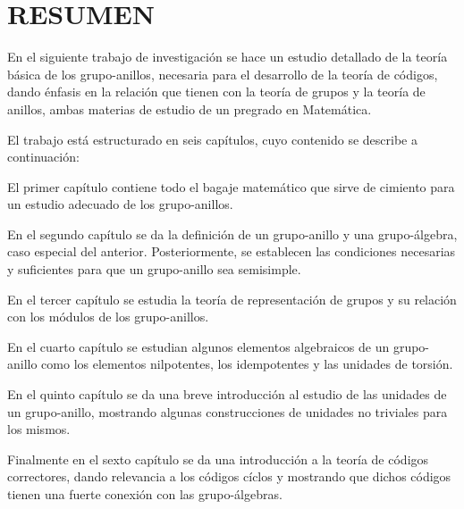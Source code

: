 \chapter{RESUMEN}
En el siguiente trabajo de investigación se hace un estudio detallado de la teoría básica de los grupo-anillos, necesaria para el desarrollo de la teoría de códigos\textbf{}, dando énfasis en la relación que tienen con la teoría de grupos y la teoría de anillos, ambas materias de estudio de un pregrado en Matemática.

El trabajo está estructurado en seis capítulos, cuyo contenido se describe a continuación:

El primer capítulo contiene todo el bagaje matemático que sirve de cimiento para un  estudio adecuado de los grupo-anillos. 

En el segundo capítulo se da la definición de un grupo-anillo y una grupo-álgebra, caso especial del anterior. Posteriormente, se establecen las condiciones necesarias y suficientes para que un grupo-anillo sea semisimple. 

En el tercer capítulo se estudia la teoría de representación de grupos y su relación con los módulos de los grupo-anillos. 

En el cuarto capítulo se estudian algunos elementos algebraicos de un grupo-anillo como los elementos nilpotentes, los idempotentes y las unidades de torsión.

En el quinto capítulo se da una breve introducción al estudio de las unidades de un grupo-anillo, mostrando algunas construcciones de unidades no triviales para los mismos.

Finalmente en el sexto capítulo se da una introducción a la teoría de códigos correctores, dando relevancia a los códigos cíclos y mostrando que dichos códigos tienen una fuerte conexión con las grupo-álgebras.




